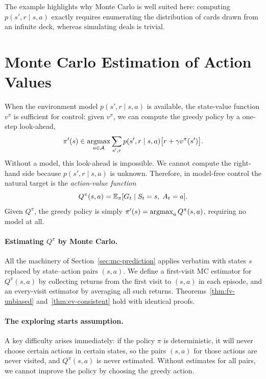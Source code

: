 The example highlights why Monte Carlo is well suited here: computing $p(s', r \mid s, a)$ exactly requires enumerating the distribution of cards drawn from an infinite deck, whereas simulating deals is trivial.


\section{Monte Carlo Estimation of Action Values}
\label{sec:mc-action-values}

When the environment model $p(s', r \mid s, a)$ is available, the state-value function $v^\pi$ is sufficient for control: given $v^\pi$, we can compute the greedy policy by a one-step look-ahead,
\[
  \pi'(s) \in \operatorname*{argmax}_{a \in \mathcal{A}} \sum_{s', r} p(s', r \mid s, a)\bigl[r + \gamma v^\pi(s')\bigr].
\]
Without a model, this look-ahead is impossible.  We cannot compute the right-hand side because $p(s', r \mid s, a)$ is unknown.  Therefore, in model-free control the natural target is the \emph{action-value function}
\begin{equation}
  \label{eq:mc-q-def}
  Q^\pi(s, a) = \operatorname{\mathbb{E}}_\pi[G_t \mid S_t = s,\; A_t = a].
\end{equation}
Given $Q^\pi$, the greedy policy is simply $\pi'(s) = \operatorname*{argmax}_{a} Q^\pi(s, a)$, requiring no model at all.

\paragraph{Estimating $Q^\pi$ by Monte Carlo.}  All the machinery of Section~\ref{sec:mc-prediction} applies verbatim with states $s$ replaced by state--action pairs $(s, a)$.  We define a first-visit MC estimator for $Q^\pi(s, a)$ by collecting returns from the first visit to $(s, a)$ in each episode, and an every-visit estimator by averaging all such returns.  Theorems~\ref{thm:fv-unbiased} and~\ref{thm:ev-consistent} hold with identical proofs.

\paragraph{The exploring starts assumption.}
A key difficulty arises immediately: if the policy $\pi$ is deterministic, it will never choose certain actions in certain states, so the pairs $(s, a)$ for those actions are never visited, and $Q^\pi(s, a)$ is never estimated.  Without estimates for all pairs, we cannot improve the policy by choosing the greedy action.

